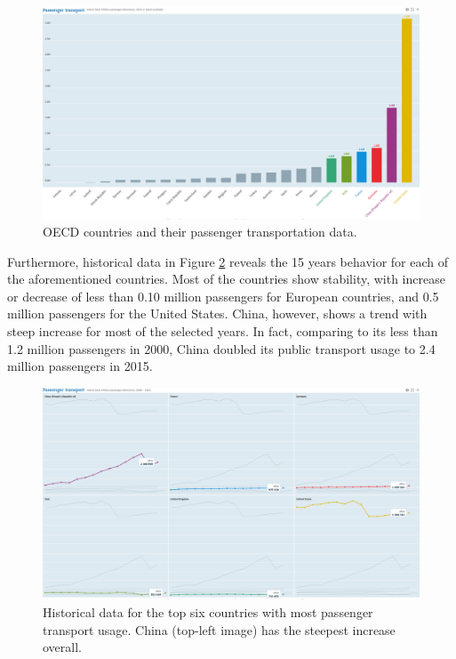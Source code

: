 \documentclass{article}
\begin{document}
\begin{figure}[H]
  	\centering
  	\includegraphics[width=\linewidth]{./images/OECD_passengers_absolute.png}
  	\caption{OECD countries and their passenger transportation data.}
  	\label{fig:transportation/passenger}
\end{figure}

Furthermore, historical data in Figure \ref{fig:transportation/passenger-trend} reveals the 15 years behavior for each of the aforementioned countries. Most of the countries show stability, with increase or decrease of less than 0.10 million passengers for European countries, and 0.5 million passengers for the United States. China, however, shows a trend with steep increase for most of the selected years. In fact, comparing to its less than 1.2 million passengers in 2000, China doubled its public transport usage to 2.4 million passengers in 2015. 
  
\begin{figure}
  	\centering
  	\includegraphics[width=\linewidth]{./images/OECD_passengers_increase.png}
  	\caption{Historical data for the top six countries with most passenger transport usage. China (top-left image) has the steepest increase overall.}
  	\label{fig:transportation/passenger-trend}
\end{figure}
\end{document}
